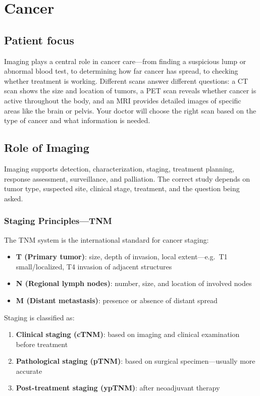 \chapter{Cancer}

\section*{Patient focus}
Imaging plays a central role in cancer care---from finding a suspicious lump or abnormal blood test, to determining how far cancer has spread, to checking whether treatment is working. Different scans answer different questions: a CT scan shows the size and location of tumors, a PET scan reveals whether cancer is active throughout the body, and an MRI provides detailed images of specific areas like the brain or pelvis. Your doctor will choose the right scan based on the type of cancer and what information is needed.


\label{ch:ch59_cancer}

\section{Role of Imaging}
Imaging supports detection, characterization, staging, treatment planning, response assessment, surveillance, and palliation. The correct study depends on tumor type, suspected site, clinical stage, treatment, and the question being asked.

\subsection{Staging Principles---TNM}
The TNM system is the international standard for cancer staging:

\begin{itemize}
  \item \textbf{T (Primary tumor)}: size, depth of invasion, local extent---e.g.\ T1 small/localized, T4 invasion of adjacent structures
  \item \textbf{N (Regional lymph nodes)}: number, size, and location of involved nodes
  \item \textbf{M (Distant metastasis)}: presence or absence of distant spread
\end{itemize}

Staging is classified as:
\begin{enumerate}
  \item \textbf{Clinical staging (cTNM)}: based on imaging and clinical examination before treatment
  \item \textbf{Pathological staging (pTNM)}: based on surgical specimen---usually more accurate
  \item \textbf{Post-treatment staging (ypTNM)}: after neoadjuvant therapy
\end{enumerate}

